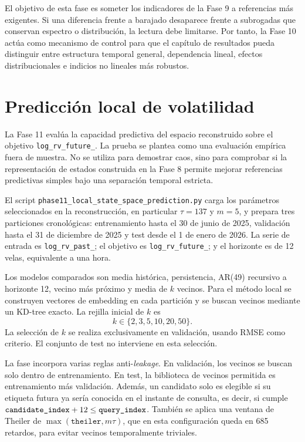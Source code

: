 El objetivo de esta fase es someter los indicadores de la Fase 9 a referencias más exigentes. Si una diferencia frente a barajado desaparece frente a subrogadas que conservan espectro o distribución, la lectura debe limitarse. Por tanto, la Fase 10 actúa como mecanismo de control para que el capítulo de resultados pueda distinguir entre estructura temporal general, dependencia lineal, efectos distribucionales e indicios no lineales más robustos.

\section{Predicción local de volatilidad}\label{sec:prediccion-local}

La Fase 11 evalúa la capacidad predictiva del espacio reconstruido sobre el objetivo \texttt{log\_\allowbreak rv\_\allowbreak future\_}. La prueba se plantea como una evaluación empírica fuera de muestra. No se utiliza para demostrar caos, sino para comprobar si la representación de estados construida en la Fase 8 permite mejorar referencias predictivas simples bajo una separación temporal estricta.

El script \texttt{phase11\_\allowbreak local\_\allowbreak state\_\allowbreak space\_\allowbreak prediction.py} carga los parámetros seleccionados en la reconstrucción, en particular \(\tau=137\) y \(m=5\), y prepara tres particiones cronológicas: entrenamiento hasta el 30 de junio de 2025, validación hasta el 31 de diciembre de 2025 y test desde el 1 de enero de 2026. La serie de entrada es \texttt{log\_\allowbreak rv\_\allowbreak past\_}; el objetivo es \texttt{log\_\allowbreak rv\_\allowbreak future\_}; y el horizonte es de 12 velas, equivalente a una hora.

Los modelos comparados son media histórica, persistencia, AR(49) recursivo a horizonte 12, vecino más próximo y media de \(k\) vecinos. Para el método local se construyen vectores de embedding en cada partición y se buscan vecinos mediante un KD-tree exacto. La rejilla inicial de \(k\) es
\[
    k \in \{2,3,5,10,20,50\}.
\]
La selección de \(k\) se realiza exclusivamente en validación, usando RMSE como criterio. El conjunto de test no interviene en esta selección.

La fase incorpora varias reglas anti-\textit{leakage}. En validación, los vecinos se buscan solo dentro de entrenamiento. En test, la biblioteca de vecinos permitida es entrenamiento más validación. Además, un candidato solo es elegible si su etiqueta futura ya sería conocida en el instante de consulta, es decir, si cumple \(\texttt{candidate\_\allowbreak index}+12 \leq \texttt{query\_\allowbreak index}\). También se aplica una ventana de Theiler de \(\max(\texttt{theiler},m\tau)\), que en esta configuración queda en 685 retardos, para evitar vecinos temporalmente triviales.

